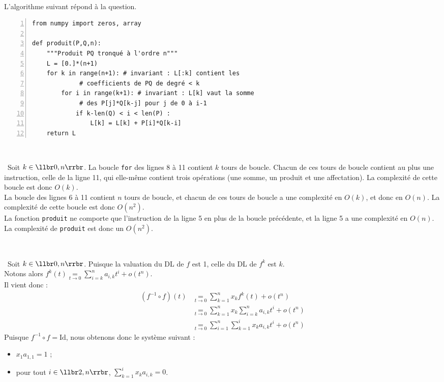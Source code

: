 \setcounter{question}{0}

\question\

L'algorithme suivant répond à la question. 
\begin{Verbatim}[gobble=0,numbers=left]
from numpy import zeros, array

def produit(P,Q,n):
    """Produit PQ tronqué à l'ordre n"""
    L = [0.]*(n+1)
    for k in range(n+1): # invariant : L[:k] contient les
			 # coefficients de PQ de degré < k
        for i in range(k+1): # invariant : L[k] vaut la somme 
			 # des P[j]*Q[k-j] pour j de 0 à i-1
            if k-len(Q) < i < len(P) :
                L[k] = L[k] + P[i]*Q[k-i]
    return L
\end{Verbatim}

\medskip\

\question\ Soit $k\in\llbr 0,n\rrbr$. La boucle \texttt{for} des lignes 8 à 11 contient $k$ tours de boucle. Chacun de 
ces tours de boucle contient au plus une instruction, celle de la ligne 11, qui elle-même contient trois opérations 
(une somme, un produit et une affectation). La complexité de cette boucle est donc $O(k)$.\\
La boucle des lignes 6 à 11 contient $n$ tours de boucle, et chacun de ces tours de boucle a une complexité en 
$O(k)$, et donc en $O(n)$. La complexité de cette boucle est donc $O(n^2)$.\\
La fonction \texttt{produit} ne comporte que l'instruction de la ligne 5 en plus de la boucle précédente, et la ligne 5 
a une complexité en $O(n)$.\\
La complexité de \texttt{produit} est donc un $O(n^2)$.


\medskip\

\question\ Soit $k\in\llbr 0,n\rrbr$. Puisque la valuation du DL de $f$ est 1, celle du DL de $f^k$ est $k$.\\
Notons alors $f^k(t)\underset{t\to0}{=}\displaystyle\sum_{i=k}^n a_{i,k}t^i + o(t^n)$.\\
Il vient donc :
\begin{align*}
 (f^{-1}\circ f)(t)&\underset{t\to0}{=}  \displaystyle\sum_{k=1}^n x_kf^k(t) + o(t^n)\\
 &\underset{t\to0}{=} \displaystyle\sum_{k=1}^n x_k\displaystyle\sum_{i=k}^na_{i,k}t^i + o(t^n)\\
 &\underset{t\to0}{=} \displaystyle\sum_{i=1}^n \displaystyle\sum_{k=1}^i x_k a_{i,k}t^i + o(t^n)
\end{align*}
Puisque $f^{-1}\circ f=\mathrm{Id}$, nous obtenons donc le système suivant :\\
\begin{itemize}
 \item $x_1 a_{1,1} = 1$ ;
 \item pour tout $i\in\llbr 2,n\rrbr$, $\displaystyle\sum_{k=1}^i x_k a_{i,k} = 0$.
\end{itemize}

